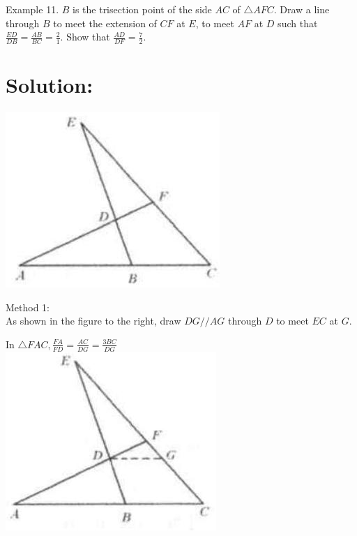 \documentclass[10pt]{article}
\begin{document}
Example 11. \(B\) is the trisection point of the side \(A C\) of \(\triangle A F C\). Draw a line through \(B\) to meet the extension of \(C F\) at \(E\), to meet \(A F\) at \(D\) such that \(\frac{E D}{D B}=\frac{A B}{B C}=\frac{2}{1}\). Show that \(\frac{A D}{D F}=\frac{7}{2}\).

\section*{Solution:}
\begin{center}
\includegraphics[max width=\textwidth]{2025_04_17_97bc1f7e44d93c271a88g-111(3)}
\end{center}

Method 1:\\
As shown in the figure to the right, draw \(D G / / A G\) through \(D\) to meet \(E C\) at \(G\).

In \(\triangle F A C, \frac{F A}{F D}=\frac{A C}{D G}=\frac{3 B C}{D G}\)\\
\includegraphics[max width=\textwidth, center]{2025_04_17_97bc1f7e44d93c271a88g-111(2)}
\end{document}
